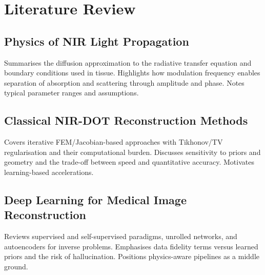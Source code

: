 
\chapter{Literature Review}

\section{Physics of NIR Light Propagation}

Summarises the diffusion approximation to the radiative transfer equation and boundary conditions used in tissue. Highlights how modulation frequency enables separation of absorption and scattering through amplitude and phase. Notes typical parameter ranges and assumptions.


\section{Classical NIR-DOT Reconstruction Methods}

Covers iterative FEM/Jacobian-based approaches with Tikhonov/TV regularisation and their computational burden. Discusses sensitivity to priors and geometry and the trade-off between speed and quantitative accuracy. Motivates learning-based accelerations.


\section{Deep Learning for Medical Image Reconstruction}

Reviews supervised and self-supervised paradigms, unrolled networks, and autoencoders for inverse problems. Emphasises data fidelity terms versus learned priors and the risk of hallucination. Positions physics-aware pipelines as a middle ground.


